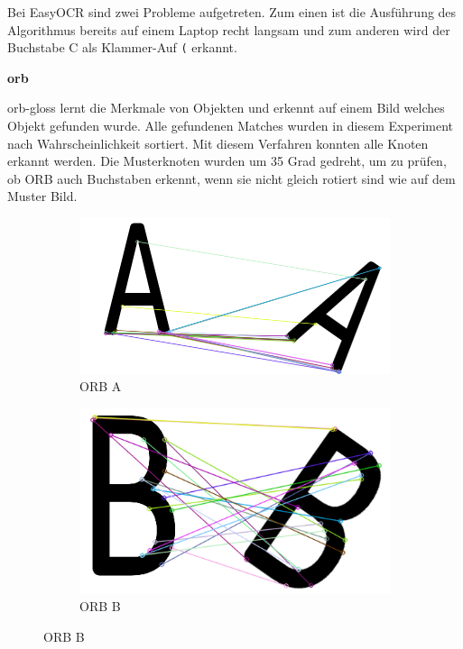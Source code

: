 Bei EasyOCR sind zwei Probleme aufgetreten. Zum einen ist die Ausführung des Algorithmus bereits auf einem Laptop recht langsam und zum anderen wird der Buchstabe C als Klammer-Auf \verb|(| erkannt.

\textbf{\acrfull{orb}}

\gls{orb-gloss} lernt die Merkmale von Objekten und erkennt auf einem Bild welches Objekt gefunden wurde. Alle gefundenen Matches wurden in diesem Experiment nach Wahrscheinlichkeit sortiert. Mit diesem Verfahren konnten alle Knoten erkannt werden. Die Musterknoten wurden um 35 Grad gedreht, um zu prüfen, ob ORB auch Buchstaben erkennt, wenn sie nicht gleich rotiert sind wie auf dem Muster Bild.

\begin{figure}[H]
\begin{subfigure}{0.3\textwidth}
\includegraphics[width=0.95\linewidth]{assets/informatik-prototyp/opencv/target_node_detection/orb-a.png} 
\caption{ORB A}
\label{fig:orb-a}
\end{subfigure}
\begin{subfigure}{0.3\textwidth}
\includegraphics[width=0.95\linewidth]{assets/informatik-prototyp/opencv/target_node_detection/orb-b.png} 
\caption{ORB B}

\end{subfigure}
\end{figure}
